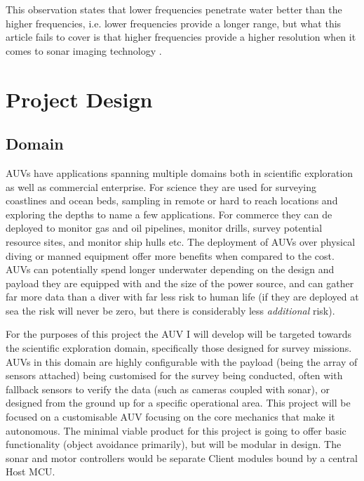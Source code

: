 \documentclass[11pt,a4paper,titlepage]{report}
\begin{document}
	This observation states that lower frequencies penetrate water better than the higher frequencies, i.e. lower frequencies provide a longer range, but what this article fails to cover is that higher frequencies provide a higher resolution when it comes to sonar imaging technology \cite{HF_SONAR}.
	
	\chapter*{Project Design}
	
	\section*{Domain}
	AUVs have applications spanning multiple domains both in scientific exploration as well as commercial enterprise. For science they are used for surveying coastlines and ocean beds, sampling in remote or hard to reach locations and exploring the depths to name a few applications. For commerce they can de deployed to monitor gas and oil pipelines, monitor drills, survey potential resource sites, and monitor ship hulls etc. The deployment of AUVs over physical diving or manned equipment offer more benefits when compared to the cost. AUVs can potentially spend longer underwater depending on the design and payload they are equipped with and the size of the power source, and can gather far more data than a diver with far less risk to human life (if they are deployed at sea the risk will never be zero, but there is considerably less \textit{additional} risk).
	
	For the purposes of this project the AUV I will develop will be targeted towards the scientific exploration domain, specifically those designed for survey missions. AUVs in this domain are highly configurable with the payload (being the array of sensors attached) being customised for the survey being conducted, often with fallback sensors to verify the data (such as cameras coupled with sonar), or designed from the ground up for a specific operational area. This project will be focused on a customisable AUV focusing on the core mechanics that make it autonomous. The minimal viable product for this project is going to offer basic functionality (object avoidance primarily), but will be modular in design. The sonar and motor controllers would be separate Client modules bound by a central Host MCU. 
	
\end{document}
